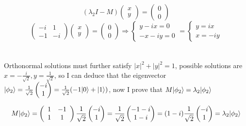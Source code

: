 \documentclass{article}
\DeclarePairedDelimiter\ket{\lvert}{\rangle}
\begin{document}
\[\left(\lambda_2 I - M \right)\begin{pmatrix} x \\ y \end{pmatrix} = \begin{pmatrix} 0 \\ 0 \end{pmatrix} \]
\[
\left( 
    \begin{array}{cc} 
       -i & 1 \\
       -1 & -i
    \end{array} 
\right)\begin{pmatrix} x \\ y \end{pmatrix} = \begin{pmatrix} 0 \\ 0 \end{pmatrix} \Rightarrow 
\begin{cases} 
y - ix =0 \\ 
-x - iy = 0
\end{cases} =
\begin{cases} 
y = ix \\ 
x = -iy 
\end{cases} 
\]
\\
\\
Orthonormal solutions must further satisfy \(|x|^2 + |y|^2 = 1\), possible solutions are \(x = -\frac{i}{\sqrt{2}}, y = \frac{1}{\sqrt{2}}\), so I can deduce that the eigenvector \(\ket{\phi_2} = \frac{1}{\sqrt{2}}\begin{pmatrix} -i \\ 1 \end{pmatrix} = \frac{1}{\sqrt{2}}(- 1 \ket{0} + \ket{1}) \), now I prove that
\(M \ket{\phi_2} = \lambda_2 \ket{\phi_2}\)

\[ M \ket{\phi_2} =  \left( 
    \begin{array}{cc} 
        1 & -1 \\
        1 & 1
    \end{array} 
\right)\frac{1}{\sqrt{2}}\begin{pmatrix} -i \\ 1 \end{pmatrix} = 
\frac{1}{\sqrt{2}}\begin{pmatrix} -1 - i \\  1 - i \end{pmatrix} = 
(1 - i) \frac{1}{\sqrt{2}}\begin{pmatrix} -i \\  1 \end{pmatrix} =
\lambda_2 \ket{\phi_2}
\]
\end{document}
